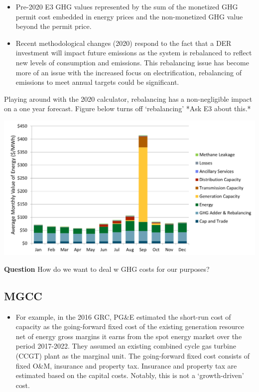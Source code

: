 \documentclass[11pt]{article}
\begin{document}
\begin{itemize}
\begin{itemize}
\item Pre-2020 E3  GHG values represented by the sum of the monetized GHG permit cost embedded in energy prices and the non-monetized GHG value beyond the permit price.

\item Recent methodological changes (2020) respond to the fact that a DER investment will impact future emissions as the system is rebalanced to reflect new levels of consumption and emissions. This rebalancing issue has become more of an issue with the increased focus on electrification, rebalancing of emissions to meet annual targets could be significant.

\end{itemize}

 Playing around with the 2020 calculator, rebalancing has a non-negligible impact on a one year forecast. Figure below turns off `rebalancing' *Ask E3 about this.*



\includegraphics[scale=0.7]{ACC2020nobalance.png}

\textbf{Question} How do we want to deal w GHG costs for our purposes?

\subsection{MGCC}

\begin{itemize}

\item For example, in the 2016 GRC, PG&E estimated the short-run cost of capacity as the going-forward fixed cost of the existing generation resource net of energy gross margins it earns from the spot energy market over the period  2017-2022.  They assumed an existing combined cycle gas turbine (CCGT) plant as the marginal unit. The going-forward fixed cost consists of fixed O&M, insurance and property tax. Insurance and property tax are estimated based on the capital costs.  Notably, this is not a `growth-driven' cost.



\end{itemize}
\end{itemize}
\end{document}
